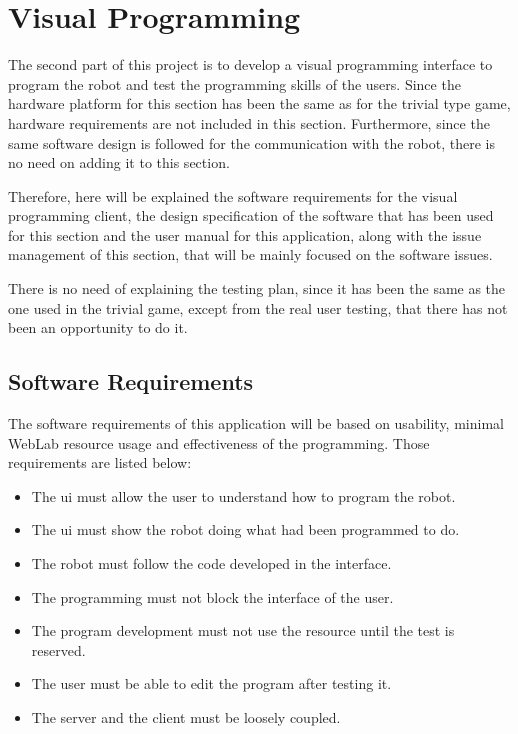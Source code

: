 \section{Visual Programming}

The second part of this project is to develop a visual programming interface to program the robot
and test the programming skills of the users. Since the hardware platform for this section has been
the same as for the trivial type game, hardware requirements are not included in this section.
Furthermore, since the same software design is followed for the communication with the robot, there
is no need on adding it to this section.

Therefore, here will be explained the software requirements for the visual programming client, the
design specification of the software that has been used for this section and the user manual for
this application, along with the issue management of this section, that will be mainly focused on
the software issues.

There is no need of explaining the testing plan, since it has been the same as the one used in the
trivial game, except from the real user testing, that there has not been an opportunity to do it.

\subsection{Software Requirements}

The software requirements of this application will be based on usability, minimal WebLab resource
usage and effectiveness of the programming. Those requirements are listed below:

\begin{itemize}

	\item The \acrlong{ui} must allow the user to understand how to program the robot.
	\item The \acrlong{ui} must show the robot doing what had been programmed to do.
	\item The robot must follow the code developed in the interface.
	\item The programming must not block the interface of the user.
	\item The program development must not use the resource until the test is reserved.
	\item The user must be able to edit the program after testing it.
	\item The server and the client must be loosely coupled.

\end{itemize}

